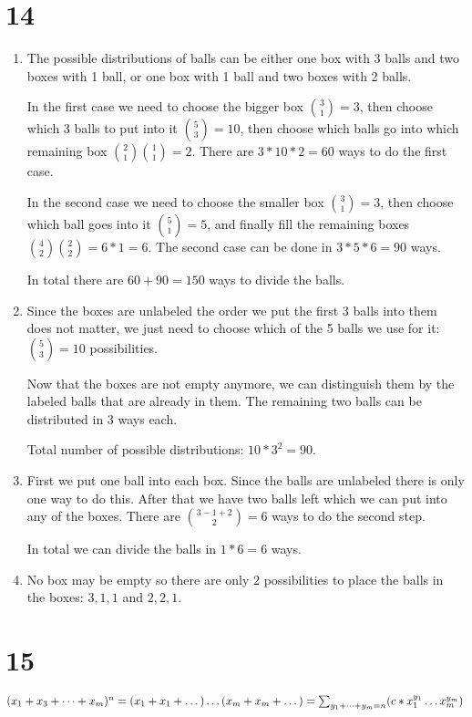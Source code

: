 \documentclass[12pt]{article}
\begin{document}
\section*{14}
\begin{enumerate}[a]
	\item %
	The possible distributions of balls can be either one box with 3 balls and two boxes with 1 ball, or one box with 1 ball and two boxes with 2 balls.

	In the first case we need to choose the bigger box $\binom{3}{1} = 3$, then choose which 3 balls to put into it $\binom{5}{3} = 10$, then choose which balls go into which remaining box $\binom{2}{1} \binom{1}{1} = 2$. There are $3 * 10 * 2 = 60$ ways to do the first case.

	In the second case we need to choose the smaller box $\binom{3}{1} = 3$, then choose which ball goes into it $\binom{5}{1} = 5$, and finally fill the remaining boxes $\binom{4}{2} \binom{2}{2} = 6 * 1 = 6$. The second case can be done in $3 * 5 * 6 = 90$ ways.

	In total there are $60 + 90 = 150$ ways to divide the balls.

	\item %
	Since the boxes are unlabeled the order we put the first 3 balls into them does not matter, we just need to choose which of the 5 balls we use for it: $\binom{5}{3} = 10$ possibilities.

	Now that the boxes are not empty anymore, we can distinguish them by the labeled balls that are already in them. The remaining two balls can be distributed in 3 ways each.

	Total number of possible distributions: $10 * 3^2 = 90$.
	\item %
	First we put one ball into each box. Since the balls are unlabeled there is only one way to do this. After that we have two balls left which we can put into any of the boxes. There are $\binom{3 - 1 + 2}{2} = 6$ ways to do the second step.

	In total we can divide the balls in $1 * 6 = 6$ ways.
	\item %
	No box may be empty so there are only 2 possibilities to place the balls in the boxes: $3, 1, 1$ and $2, 2, 1$.
\end{enumerate}

\section*{15}
$(x_1 + x_3 + \dots + x_m)^n\\
= (x_1 + x_1 + \dots) \dots (x_m  + x _m + \dots)\\
= \sum_{y_1 + \dots + y_m = n} (c * x_1^{y_1} \dots x_m^{y_m})$
\end{document}
